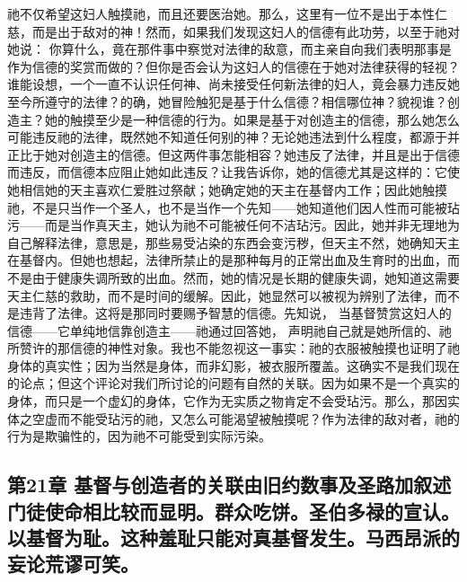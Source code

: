 祂不仅希望这妇人触摸祂，而且还要医治她。那么，这里有一位不是出于本性仁慈，而是出于敌对的神！然而，如果我们发现这妇人的信德有此功劳，以至于祂对她说： 你算什么，竟在那件事中察觉对法律的敌意，而主亲自向我们表明那事是作为信德的奖赏而做的？但你是否会认为这妇人的信德在于她对法律获得的轻视？谁能设想，一个一直不认识任何神、尚未接受任何新法律的妇人，竟会暴力违反她至今所遵守的法律？的确，她冒险触犯是基于什么信德？相信哪位神？貌视谁？创造主？她的触摸至少是一种信德的行为。如果是基于对创造主的信德，那么她怎么可能违反祂的法律，既然她不知道任何别的神？无论她违法到什么程度，都源于并正比于她对创造主的信德。但这两件事怎能相容？她违反了法律，并且是出于信德而违反，而信德本应阻止她如此违反？让我告诉你，她的信德尤其是这样的：它使她相信她的天主喜欢仁爱胜过祭献；她确定她的天主在基督内工作；因此她触摸祂，不是只当作一个圣人，也不是当作一个先知——她知道他们因人性而可能被玷污——而是当作真天主，她认为祂不可能被任何不洁玷污。因此，她并非无理地为自己解释法律，意思是，那些易受沾染的东西会变污秽，但天主不然，她确知天主在基督内。但她也想起，法律所禁止的是那种每月的正常出血及生育时的出血，而不是由于健康失调所致的出血。然而，她的情况是长期的健康失调，她知道这需要天主仁慈的救助，而不是时间的缓解。因此，她显然可以被视为辨别了法律，而不是违背了法律。这将是那同时要赐予智慧的信德。先知说， 当基督赞赏这妇人的信德——它单纯地信靠创造主——祂通过回答她， 声明祂自己就是她所信的、祂所赞许的那信德的神性对象。我也不能忽视这一事实：祂的衣服被触摸也证明了祂身体的真实性；因为当然是身体，而非幻影，被衣服所覆盖。这确实不是我们现在的论点；但这个评论对我们所讨论的问题有自然的关联。因为如果不是一个真实的身体，而只是一个虚幻的身体，它作为无实质之物肯定不会受玷污。那么，那因实体之空虚而不能受玷污的祂，又怎么可能渴望被触摸呢？作为法律的敌对者，祂的行为是欺骗性的，因为祂不可能受到实际污染。\par


\subsection{第21章 基督与创造者的关联由旧约数事及圣路加叙述门徒使命相比较而显明。群众吃饼。圣伯多禄的宣认。以基督为耻。这种羞耻只能对真基督发生。马西昂派的妄论荒谬可笑。}

